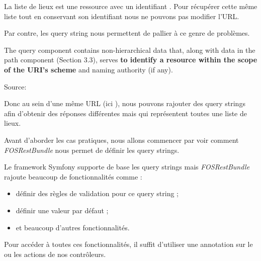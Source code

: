 \documentclass[big]{zmdocument}
\begin{document}
La liste de lieux est une ressource avec un identifiant . Pour récupérer cette même liste tout en conservant son identifiant nous ne pouvons pas modifier l'URL.



Par contre, les query string nous permettent de pallier à ce genre de problèmes.



\begin{Quotation}
The query component contains non-hierarchical data that, along with
   data in the path component (Section 3.3), serves \textbf{to identify a
   resource within the scope of the URI's scheme} and naming authority
   (if any).
\end{Quotation}



Source: 



Donc au sein d'une même URL (ici ), nous pouvons rajouter des query strings afin d'obtenir des réponses différentes mais qui représentent toutes une liste de lieux.





Avant d'aborder les cas pratiques, nous allons commencer par voir comment \textit{FOSRestBundle} nous permet de définir les query strings.



Le framework Symfony supporte de base les query strings mais \textit{FOSRestBundle} rajoute beaucoup de fonctionnalités comme :



\begin{itemize}
\item définir des règles de validation pour ce query string ;
\item définir une valeur par défaut ;
\item et beaucoup d'autres fonctionnalités.
\end{itemize}




Pour accéder à toutes ces fonctionnalités, il suffit d'utiliser une annotation  sur le ou les actions de nos contrôleurs.
\end{document}
